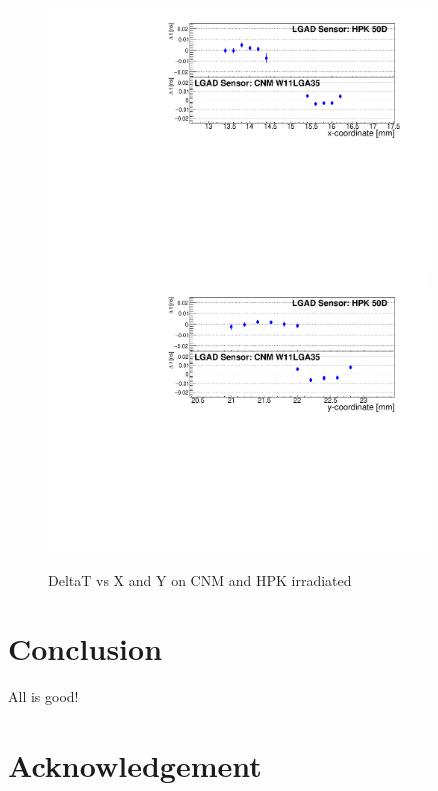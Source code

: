 \documentclass[preprint,1p]{elsarticle}
\begin{document}
\begin{figure}[htbp] 
\centering
\includegraphics[width=0.9\textwidth]{figs/USCSBoard_HPK50DIrradiated-CNMW11LGA35_Run936-961/IrradiatedSensorStudy_MeanTime_vs_X.pdf} 
\includegraphics[width=0.9\textwidth]{figs/USCSBoard_HPK50DIrradiated-CNMW11LGA35_Run936-961/IrradiatedSensorStudy_MeanTime_vs_Y.pdf} 
\caption{DeltaT vs X and Y on CNM and HPK irradiated} 
\label{fig:Sensors} 
\end{figure} 
 



\clearpage
\section{Conclusion}
\label{sec:conclusion} 

All is good!

\section*{Acknowledgement}
\end{document}
